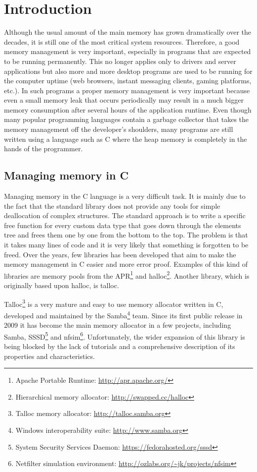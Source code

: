 \chapter{Introduction}

Although the usual amount of the main memory has grown dramatically over the
decades, it is still one of the most critical system resources. Therefore, a
good memory management is very important, especially in programs that are
expected to be running permanently. This no longer applies only to drivers and
server applications but also more and more desktop programs are used to be
running for the computer uptime (web browsers, instant messaging clients,
gaming platforms, etc.). In such programs a proper memory management is very
important because even a small memory leak that occurs periodically may result
in a much bigger memory consumption after several hours of the application
runtime. Even though many popular programming languages contain a garbage
collector that takes the memory management off the developer's shoulders, many
programs are still written using a language such as C where the heap memory is
completely in the hands of the programmer.

\section{Managing memory in C}

Managing memory in the C language is a very difficult task. It is mainly due to
the fact that the standard library does not provide any tools for simple
deallocation of complex structures. The standard approach is to write a
specific free function for every custom data type that goes down through the
elements tree and frees them one by one from the bottom to the top. The problem
is that it takes many lines of code and it is very likely that something is
forgotten to be freed. Over the years, few libraries has been developed that
aim to make the memory management in C easier and more error proof. Examples of
this kind of libraries are memory pools from the APR\footnote{Apache Portable
Runtime: \url{http://apr.apache.org/}} and halloc\footnote{Hierarchical memory
allocator: \url{http://swapped.cc/halloc}}. Another library, which is
originally based upon halloc, is talloc.

Talloc\footnote{Talloc memory allocator: \url{http://talloc.samba.org}} is a
very mature and easy to use memory allocator written in C, developed and
maintained by the Samba\footnote{Windows interoperability suite:
\url{http://www.samba.org}} team. Since its first public release in 2009 it has
become the main memory allocator in a few projects, including Samba,
SSSD\footnote{System Security Services Daemon:
\url{https://fedorahosted.org/sssd}} and nfsim\footnote{Netfilter simulation
environment: \url{http://ozlabs.org/~jk/projects/nfsim}}. Unfortunately, the
wider expansion of this library is being blocked by the lack of tutorials and a
comprehensive description of its properties and characteristics.

